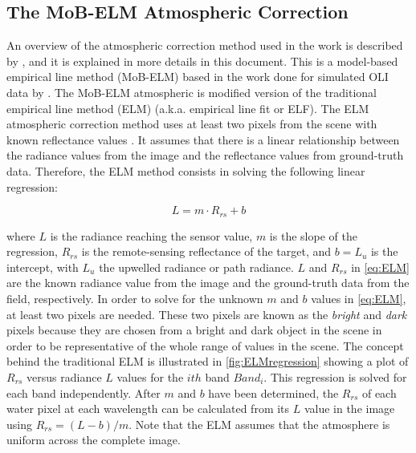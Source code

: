 \documentclass[onecolumn,3p]{elsarticle}
\begin{document}
\subsection{The MoB-ELM Atmospheric Correction}
An overview of the atmospheric correction method used in the work is described by \cite{Concha2014SPIE}, and it is explained in more details in this document. This is a model-based empirical line method (MoB-ELM) based in the work done for simulated OLI data by \cite{Gerace:2012}. The MoB-ELM atmospheric is modified version of the traditional empirical line method (ELM) (a.k.a. empirical line fit or ELF). The ELM atmospheric correction method uses at least two pixels from the scene with known reflectance values \cite{Schott}. It assumes that there is a linear relationship between the radiance values from the image and the reflectance values from ground-truth data. Therefore, the ELM method consists in solving the following linear regression:

\begin{equation}\label{eq:ELM} 
	L = m\cdot R_{rs} + b
\end{equation}

\noindent where $L$ is the radiance reaching the sensor value, $m$ is the slope of the regression, $R_{rs}$ is the remote-sensing reflectance of the target, and $b=L_u$ is the intercept, with $L_u$ the upwelled radiance or path radiance. $L$ and $R_{rs}$ in \autoref{eq:ELM} are the known radiance value from the image and the ground-truth data from the field, respectively. In order to solve for the unknown $m$ and $b$ values in \autoref{eq:ELM}, at least two pixels are needed. These two pixels are known as the {\it bright} and {\it dark} pixels because they are chosen from a bright and dark object in the scene in order to be representative of the whole range of values in the scene. The concept behind the traditional ELM is illustrated in \autoref{fig:ELMregression} showing a plot of $R_{rs}$ versus radiance $L$ values for the $ith$ band $Band_{i}$. This regression is solved for each band independently. After $m$ and $b$ have been determined, the $R_{rs}$ of each water pixel at each wavelength can be calculated from its $L$ value in the image using $R_{rs}=(L-b)/m$. Note that the ELM assumes that the atmosphere is uniform across the complete image.
\end{document}
